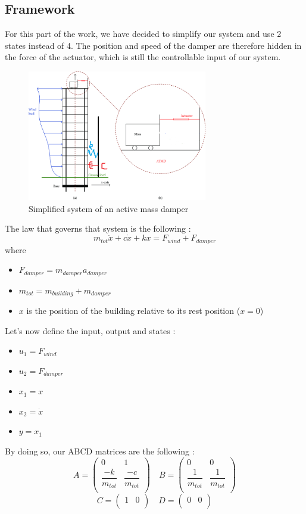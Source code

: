 \subsection{Framework}
For this part of the work, we have decided to simplify our system and use 2 states instead of 4. The position and speed of the damper are therefore hidden in the force of the actuator, which is still the controllable input of our system.
\begin{figure}[H]
    \centering
    \includegraphics[width=0.7\textwidth]{resources/png/simplified-system.png}
    \caption{Simplified system of an active mass damper}
    \label{fig:simplified-system}
\end{figure}
The law that governs that system is the following : 
$$
m_{tot}\ddot{x} + c\dot{x} + kx = F_{wind} + F_{damper}
$$
where
\begin{itemize}
    \item $F_{damper} = m_{damper}a_{damper}$
    \item $m_{tot} = m_{building} + m_{damper}$
    \item $x$ is the position of the building relative to its rest position ($x = 0$)
\end{itemize}
Let's now define the input, output and states : 
\begin{itemize}
    \item $u_1 = F_{wind}$
    \item $u_2 = F_{damper}$
    \item $x_1 = x$
    \item $x_2 = \dot{x}$
    \item $y = x_1$ 
\end{itemize}
By doing so, our ABCD matrices are the following :
$$
A = \begin{pmatrix}
    0 & 1\\
    \dfrac{-k}{m_{tot}} & \dfrac{-c}{m_{tot}}\\
\end{pmatrix}
\quad
B = \begin{pmatrix}
    0 & 0\\
    \dfrac{1}{m_{tot}} & \dfrac{1}{m_{tot}}\\
\end{pmatrix}
$$
$$
C = \begin{pmatrix}
    1 & 0\\
\end{pmatrix}
\quad
D = \begin{pmatrix}
    0 & 0\\
\end{pmatrix}
$$
